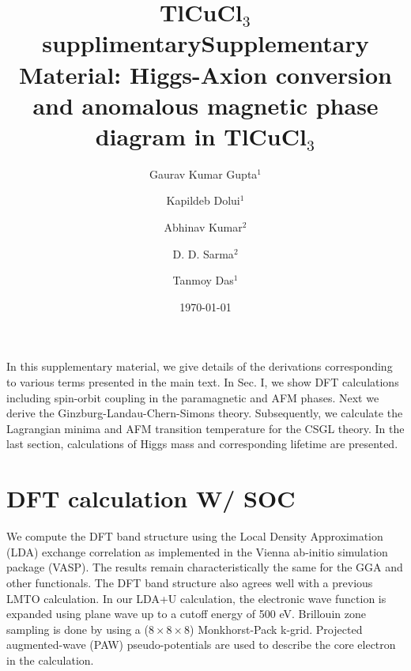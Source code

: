 \documentclass[aps,floatfix,prl]{revtex4}
\newcommand{\titlename}{TlCuCl$_3$ supplimentary}
\begin{document}
\relax



\title{\titlename}
\title{Supplementary Material: Higgs-Axion conversion and anomalous magnetic phase diagram in TlCuCl$_3$}

\author{Gaurav Kumar Gupta$^1$}
\author{Kapildeb Dolui$^1$}
\author{Abhinav Kumar$^2$}
\author{D. D. Sarma$^2$}
\author{Tanmoy Das$^1$}



\date{\today}

\maketitle
In this supplementary material, we give details of the derivations corresponding to various terms presented in the main text.  In Sec. I, we show DFT calculations including spin-orbit coupling in the paramagnetic and AFM phases. Next we derive the Ginzburg-Landau-Chern-Simons theory. Subsequently, we calculate the Lagrangian minima and AFM transition temperature  for the CSGL theory. In the last section, calculations of Higgs mass and corresponding lifetime are presented.

\section{DFT calculation W/ SOC}
We compute the DFT band structure using the Local  Density Approximation (LDA) exchange correlation as implemented in the Vienna  ab-initio  simulation  package  (VASP)\cite{DFT1}. The results remain characteristically the same for the GGA and other functionals. The DFT band structure also agrees well with a previous LMTO calculation.\cite{LMTODFT} In our LDA+U calculation, the electronic wave function is expanded using plane wave up to a cutoff energy of 500 eV. Brillouin zone sampling is done by using a ($8\times8\times8$) Monkhorst-Pack k-grid. Projected augmented-wave (PAW) pseudo-potentials are used to describe the core electron in the calculation\cite{DFT2}. 
\end{document}
